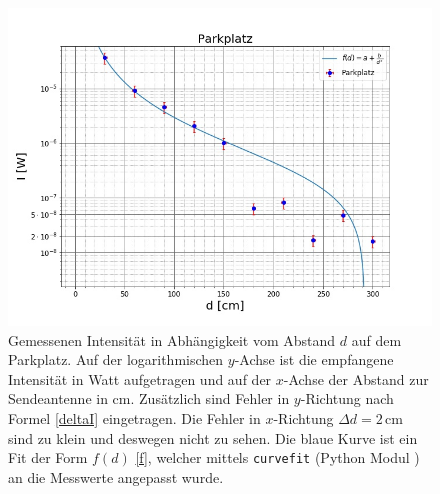 \documentclass[titlepage,11pt,a4paper,ngerman]{article}
\begin{document}
\begin{figure}[ht]
	\includegraphics[scale=0.55]{Bilder/Abstand-Parkplatz.jpg}
	\centering
	\caption{Gemessenen Intensität in Abhängigkeit vom Abstand $d$ auf dem Parkplatz. Auf der logarithmischen $y$-Achse ist die empfangene Intensität in Watt aufgetragen und auf der $x$-Achse der Abstand zur Sendeantenne in cm. Zusätzlich sind Fehler in $y$-Richtung nach Formel \eqref{deltaI} eingetragen. Die Fehler in $x$-Richtung $\Delta d = 2\,$cm sind zu klein und deswegen nicht zu sehen. Die blaue Kurve ist ein Fit der Form $f(d)$ \eqref{f}, welcher mittels \texttt{curvefit} (Python Modul \cite{curvescipy}) an die Messwerte angepasst wurde.}
	\label{Parkplatz-A}
\end{figure}
\end{document}
